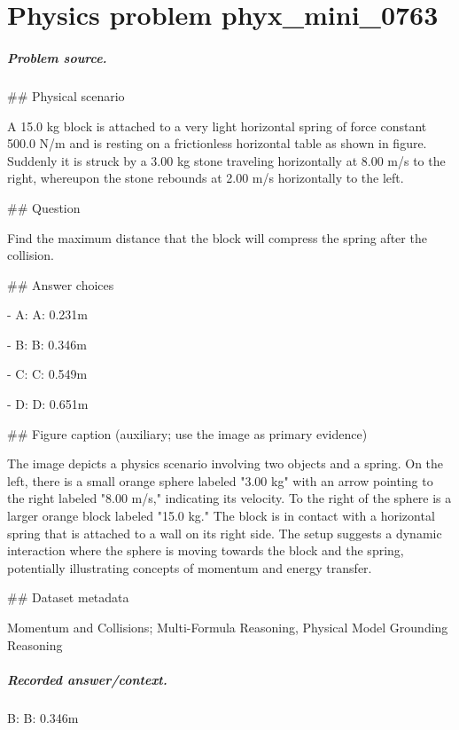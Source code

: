 
\chapter{Physics problem phyx\_mini\_0763}
\label{ch:PhyXMiniProblems_problem_phyx_mini_0763}

\paragraph{Problem source.}
\#\# Physical scenario

A 15.0 kg block is attached to a very light horizontal spring of force constant 500.0 N/m and is resting on a frictionless horizontal table as shown in figure. Suddenly it is struck by a 3.00 kg stone traveling horizontally at 8.00 m/s to the right, whereupon the stone rebounds at 2.00 m/s horizontally to the left.

\#\# Question

Find the maximum distance that the block will compress the spring after the collision.

\#\# Answer choices

- A: A: 0.231m

- B: B: 0.346m

- C: C: 0.549m

- D: D: 0.651m

\#\# Figure caption (auxiliary; use the image as primary evidence)

The image depicts a physics scenario involving two objects and a spring. On the left, there is a small orange sphere labeled "3.00 kg" with an arrow pointing to the right labeled "8.00 m/s," indicating its velocity. To the right of the sphere is a larger orange block labeled "15.0 kg." The block is in contact with a horizontal spring that is attached to a wall on its right side. The setup suggests a dynamic interaction where the sphere is moving towards the block and the spring, potentially illustrating concepts of momentum and energy transfer.

\#\# Dataset metadata

Momentum and Collisions; Multi-Formula Reasoning, Physical Model Grounding Reasoning

\paragraph{Recorded answer/context.}
B: B: 0.346m

